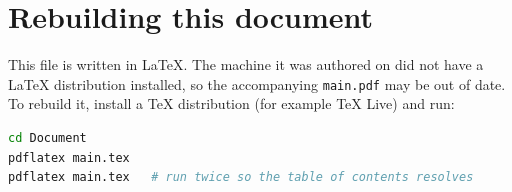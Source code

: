\documentclass[a4paper,12pt]{article}
\newcommand{\code}[1]{\texttt{#1}}
\begin{document}
\section{Rebuilding this document}

This file is written in LaTeX. The machine it was authored on did not have a
LaTeX distribution installed, so the accompanying \code{main.pdf} may be out of
date. To rebuild it, install a TeX distribution (for example TeX Live) and run:

\begin{lstlisting}[language=bash]
cd Document
pdflatex main.tex
pdflatex main.tex   # run twice so the table of contents resolves
\end{lstlisting}
\end{document}
